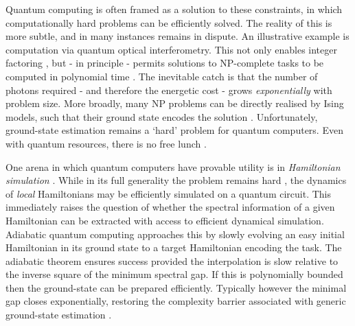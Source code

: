 \documentclass[reprint, aps,prx,showpacs,bibfootnote,preprintnumbers, mathtools, superscriptaddress, amsmath,amssymb]{revtex4-2}
\begin{document}
Quantum computing is often framed as a solution to these constraints, in which computationally hard problems can be efficiently solved. The reality of this is more subtle, and in many instances remains in dispute. An illustrative example is computation via quantum optical interferometry. This not only enables integer factoring  \cite{clauser_factoring_1996}, but - in principle - permits solutions to NP-complete tasks to be computed in polynomial time \cite{shaked_optical_2007,cerny_quantum_1993}. The inevitable catch is that the number of photons required - and therefore the energetic cost - grows \textit{exponentially} with problem size. More broadly, many NP problems can be directly realised by Ising models, such that their ground state encodes the solution \cite{lucas_ising_2014}. Unfortunately, ground-state estimation remains a `hard' problem \cite{cubitt_complexity_2016, kempe_complexity_2006, gharibian_quantum_2015, osborne_hamiltonian_2012} for quantum computers. Even with quantum resources, there is no free lunch \cite{volkoff_universal_2021}.

One arena in which quantum computers have provable utility is in \textit{Hamiltonian simulation} \cite{lloyd1996universal, zalka_simulating_1998}. While in its full generality the problem remains hard \cite{osborne_hamiltonian_2012}, the dynamics of \textit{local} Hamiltonians may be efficiently simulated on a quantum circuit. This immediately raises the question of whether the spectral information of a given Hamiltonian can be extracted with access to efficient dynamical simulation. Adiabatic quantum computing \cite{aharonov2007adiabatic,farhi2001quantum} approaches this by slowly evolving an easy initial Hamiltonian in its ground state to a target Hamiltonian encoding the task. The adiabatic theorem ensures success provided the interpolation is slow relative to the inverse square of the minimum spectral gap. If this is polynomially bounded then the ground-state can be prepared efficiently. Typically however the minimal gap closes exponentially, restoring the complexity barrier associated with generic ground-state estimation \cite{kempe_complexity_2006}.
\end{document}
